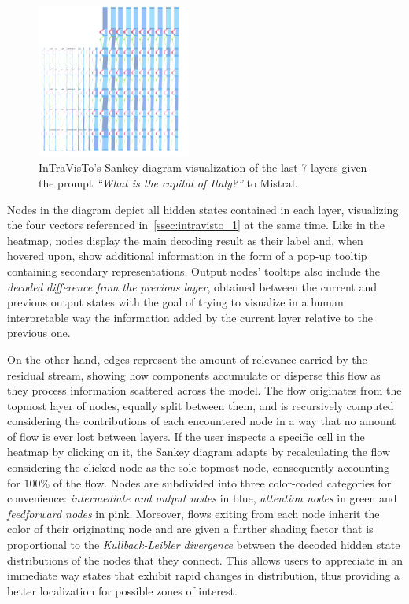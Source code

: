 \documentclass[11pt,a4paper,twocolumn]{article}
\begin{document}
\begin{figure}[tbh!]
    \centering
    \includegraphics[width=0.45\textwidth]{exp_intravisto_2A_sankey.png}
    \caption{InTraVisTo's Sankey diagram visualization of the last 7 layers given the prompt \emph{``What is the capital of Italy?''} to Mistral.}
    \label{fig:exp_intravisto_2_A}
    \vspace{-10pt}
\end{figure}

Nodes in the diagram depict all hidden states contained in each layer, visualizing the four vectors referenced in~\cref{ssec:intravisto_1} at the same time.
Like in the heatmap, nodes display the main decoding result as their label and, when hovered upon, show additional information in the form of a pop-up tooltip containing secondary representations.
Output nodes' tooltips also include the \emph{decoded difference from the previous layer}, obtained between the current and previous output states with the goal of trying to visualize in a human interpretable way the information added by the current layer relative to the previous one.

On the other hand, edges represent the amount of relevance carried by the residual stream, showing how components accumulate or disperse this flow as they process information scattered across the model.
The flow originates from the topmost layer of nodes, equally split between them, and is recursively computed considering the contributions of each encountered node in a way that no amount of flow is ever lost between layers.
If the user inspects a specific cell in the heatmap by clicking on it, the Sankey diagram adapts by recalculating the flow considering the clicked node as the sole topmost node, consequently accounting for $100\%$ of the flow.
Nodes are subdivided into three color-coded categories for convenience: \emph{intermediate and output nodes} in blue, \emph{attention nodes} in green and \emph{feedforward nodes} in pink.
Moreover, flows exiting from each node inherit the color of their originating node and are given a further shading factor that is proportional to the \emph{Kullback-Leibler divergence} between the decoded hidden state distributions of the nodes that they connect.
This allows users to appreciate in an immediate way states that exhibit rapid changes in distribution, thus providing a better localization for possible zones of interest.
\end{document}
